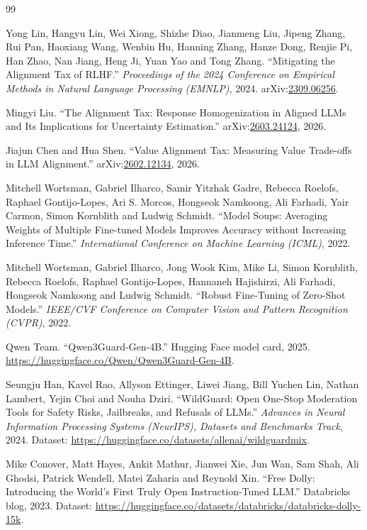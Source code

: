 \documentclass[11pt,a4paper]{article}
\begin{document}
\begin{thebibliography}{99}

Yong Lin, Hangyu Lin, Wei Xiong, Shizhe Diao, Jianmeng Liu, Jipeng Zhang, Rui Pan, Haoxiang Wang, Wenbin Hu, Hanning Zhang, Hanze Dong, Renjie Pi, Han Zhao, Nan Jiang, Heng Ji, Yuan Yao and Tong Zhang.
``Mitigating the Alignment Tax of RLHF.''
\emph{Proceedings of the 2024 Conference on Empirical Methods in Natural Language Processing (EMNLP)}, 2024.
arXiv:\href{https://arxiv.org/abs/2309.06256}{2309.06256}.

Mingyi Liu.
``The Alignment Tax: Response Homogenization in Aligned LLMs and Its Implications for Uncertainty Estimation.''
arXiv:\href{https://arxiv.org/abs/2603.24124}{2603.24124}, 2026.

Jiajun Chen and Hua Shen.
``Value Alignment Tax: Measuring Value Trade-offs in LLM Alignment.''
arXiv:\href{https://arxiv.org/abs/2602.12134}{2602.12134}, 2026.

Mitchell Wortsman, Gabriel Ilharco, Samir Yitzhak Gadre, Rebecca Roelofs, Raphael Gontijo-Lopes, Ari S. Morcos, Hongseok Namkoong, Ali Farhadi, Yair Carmon, Simon Kornblith and Ludwig Schmidt.
``Model Soups: Averaging Weights of Multiple Fine-tuned Models Improves Accuracy without Increasing Inference Time.''
\emph{International Conference on Machine Learning (ICML)}, 2022.

Mitchell Wortsman, Gabriel Ilharco, Jong Wook Kim, Mike Li, Simon Kornblith, Rebecca Roelofs, Raphael Gontijo-Lopes, Hannaneh Hajishirzi, Ali Farhadi, Hongseok Namkoong and Ludwig Schmidt.
``Robust Fine-Tuning of Zero-Shot Models.''
\emph{IEEE/CVF Conference on Computer Vision and Pattern Recognition (CVPR)}, 2022.

Qwen Team.
``Qwen3Guard-Gen-4B.''
Hugging Face model card, 2025.
\url{https://huggingface.co/Qwen/Qwen3Guard-Gen-4B}.

Seungju Han, Kavel Rao, Allyson Ettinger, Liwei Jiang, Bill Yuchen Lin, Nathan Lambert, Yejin Choi and Nouha Dziri.
``WildGuard: Open One-Stop Moderation Tools for Safety Risks, Jailbreaks, and Refusals of LLMs.''
\emph{Advances in Neural Information Processing Systems (NeurIPS), Datasets and Benchmarks Track}, 2024.
Dataset: \url{https://huggingface.co/datasets/allenai/wildguardmix}.

Mike Conover, Matt Hayes, Ankit Mathur, Jianwei Xie, Jun Wan, Sam Shah, Ali Ghodsi, Patrick Wendell, Matei Zaharia and Reynold Xin.
``Free Dolly: Introducing the World's First Truly Open Instruction-Tuned LLM.''
Databricks blog, 2023.
Dataset: \url{https://huggingface.co/datasets/databricks/databricks-dolly-15k}.


\end{thebibliography}
\end{document}
